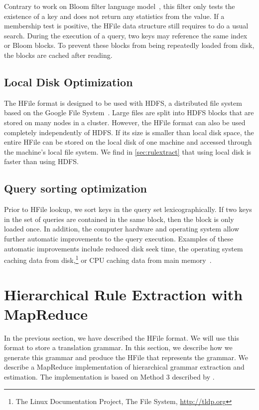 Contrary to
work on Bloom filter language
model~\citep{talbot-osborne:2007:ACL,talbot-osborne:2007:EMNLP-CoNLL}, this
filter only tests the existence of a key and does not return any statistics from
the value. If a membership test is positive, the HFile data structure still
requires to do a usual search. During the execution of a query, two keys may
reference the same index or Bloom blocks. To prevent these blocks from being
repeatedly loaded from disk, the blocks are cached after reading.

\subsection{Local Disk Optimization}

The HFile format is designed to be used with HDFS, a distributed file system
based on the Google File System~\citep{ghemawat-gobioff-leung:2003:OSP}. Large
files are split into HDFS blocks that are stored on many nodes in a cluster.
However, the HFile format can also be used completely independently of HDFS. If
its size is smaller than local disk space, the entire HFile can be stored on the local
disk of one machine and accessed through the machine's local file system. We
find in \autoref{sec:rulextract} that using local disk
is faster than using HDFS.

\subsection{Query sorting optimization}

Prior to HFile lookup, we sort keys in the query set lexicographically. If two
keys in the set of queries are contained in the same block, then the block is
only loaded once. In addition, the computer hardware and operating system allow
further automatic improvements to the query execution. Examples of these
automatic improvements include reduced disk seek time, the operating system
caching data from
disk,\footnote{The Linux Documentation Project, The File System, \url{http://tldp.org}}
or CPU caching data from main memory~\citep{patterson-hennessy:2005:COA}.

\section{Hierarchical Rule Extraction with MapReduce}
\label{sec:rulextractMapReduce}

In the previous section, we have described the HFile format. We will use
this format to store a translation grammar. In this
section, we describe how we generate this grammar and produce the HFile
that represents the grammar.
We describe a MapReduce implementation of hierarchical grammar
extraction and estimation. The implementation is based on Method 3 described by
\citet{dyer-cordova-mont-lin:2008:WMT}.

